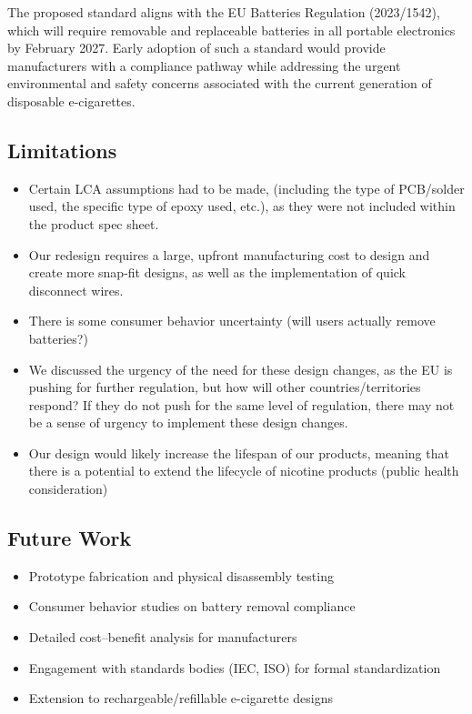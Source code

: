 The proposed standard aligns with the EU Batteries Regulation (2023/1542), which will require removable and replaceable batteries in all portable electronics by February 2027. Early adoption of such a standard would provide manufacturers with a compliance pathway while addressing the urgent environmental and safety concerns associated with the current generation of disposable e-cigarettes.

\subsection{Limitations}

\begin{itemize}
    \item Certain LCA assumptions had to be made, (including the type of PCB/solder used, the specific type of epoxy used, etc.), as they were not included within the product spec sheet.
    \item Our redesign requires a large, upfront manufacturing cost to design and create more snap-fit designs, as well as the implementation of quick disconnect wires.
    \item There is some consumer behavior uncertainty (will users actually remove batteries?)
    \item We discussed the urgency of the need for these design changes, as the EU is pushing for further regulation, but how will other countries/territories respond? If they do not push for the same level of regulation, there may not be a sense of urgency to implement these design changes. 
    \item Our design would likely increase the lifespan of our products, meaning that there is a potential to extend the lifecycle of nicotine products (public health consideration)
\end{itemize}

\subsection{Future Work}
\begin{itemize}
    \item Prototype fabrication and physical disassembly testing
    \item Consumer behavior studies on battery removal compliance
    \item Detailed cost--benefit analysis for manufacturers
    \item Engagement with standards bodies (IEC, ISO) for formal standardization
    \item Extension to rechargeable/refillable e-cigarette designs
\end{itemize}

